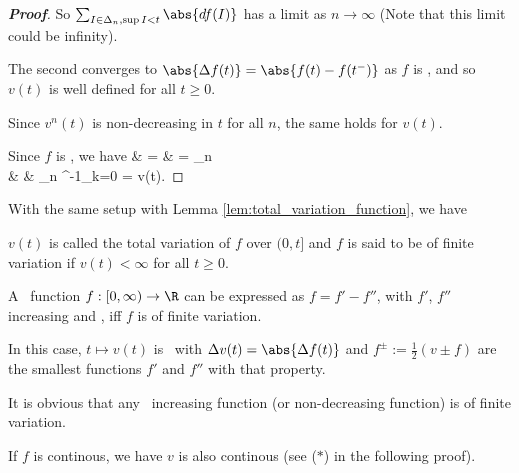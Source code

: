 \begin{proof}[\bf Proof]
So $\sum_{I\in \Delta_n, \sup I < t} \abs{df(I)}$ has a limit as $n \to \infty$ (Note that this limit could be infinity).

The second converges to $\abs{\Delta f(t)}= \abs{f(t) - f(t^-)}$ as $f$ is \cadlag, and so $v(t)$ is well defined for all $t \geq 0$.

Since $v^n(t)$ is non-decreasing in $t$ for all $n$, the same holds for $v(t)$.

Since $f$ is \cadlag, we have
\beast
{} & = &  = \lim_{n\to \infty} \\
& \leq & \lim_{n\to \infty} \sum^{-1}_{k=0}  = v(t).
\eeast
\end{proof}

With the same setup with Lemma \ref{lem:total_variation_function}, we have

\begin{definition}\label{def:total_variation_cadlag}
$v(t)$ is called the total variation of $f$ over $(0, t]$ and $f$ is said to be of finite variation if $v(t) < \infty$ for all $t \geq 0$.
\end{definition}

\begin{proposition}\label{pro:cadlag_function_two_increasing_function}
A \cadlag\ function $f: [0,\infty) \to  \R$ can be expressed as $f = f' - f''$, with $f'$, $f''$ increasing and \cadlag, iff $f$ is of finite variation.

In this case, $t \mapsto v(t)$ is \cadlag\ with $\Delta v(t) = \abs{\Delta f(t)}$ and $f^\pm := \frac 12 (v \pm f)$ are the smallest functions $f'$ and $f''$ with that property.
\end{proposition}

\begin{example}
It is obvious that any \cadlag\ increasing function (or non-decreasing function) is of finite variation.
\end{example}

\begin{remark}
If $f$ is continous, we have $v$ is also continous (see ($*$) in the following proof).
\end{remark}

